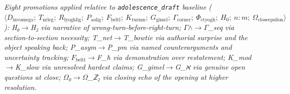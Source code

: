 \documentclass[12pt,a4paper]{article}
\begin{document}
\emph{Eight promotions applied relative to \texttt{adolescence\_draft} baseline ($\langle D_{\text{invomega}};\ T_{\text{nrleg}};\ R_{\text{lyoghlig}};\ P_{\text{aolig}};\ F_{\text{beltl}};\ K_{\text{turnm}};\ G_\text{gimel};\ \Gamma_{\text{corner}};\ \Phi_{\text{ctyogh}};\ H_0;\ n{:}m;\ \Omega_{\text{closeepsilon}} \rangle$): H₀$\rightarrow$H₂ via narrative of wrong-turn-before-right-turn; $\Gamma$$\land$$\rightarrow$$\Gamma$\_seq via section-to-section necessity; T\_net$\rightarrow$T\_bowtie via authorial surprise and the object speaking back; P\_asym$\rightarrow$P\_pm via named counterarguments and uncertainty tracking; $F_{\text{beltl}}$$\rightarrow$F\_ħ via demonstration over restatement; K\_mod$\rightarrow$K\_slow via unresolved hardest claims; G\_gimel$\rightarrow$G\_ℵ via genuine open questions at close; $\Omega$₀$\rightarrow$$\Omega$\_ℤ₂ via closing echo of the opening at higher resolution.}
\end{document}
